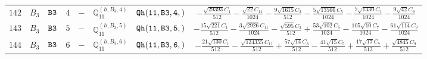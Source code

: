 \documentclass[fleqn,8pt]{jsarticle}
\begin{document}
\begin{table}[ht!]
\begin{center}
\begin{tabular}{cccccccc}
$ 142 $ & $ B_{3} $ & $ {\tt B3} $ & $ 4 $ & $ - $ & $ \mathbb{Q}_{11}^{(h,B_{3},4)} $ & $ {\tt Qh(11,B3,4,)} $ & $ - \frac{\sqrt{29393} C_{1}}{512} - \frac{\sqrt{22} C_{11}}{1024} - \frac{9 \sqrt{1615} C_{3}}{512} - \frac{5 \sqrt{13566} C_{5}}{1024} - \frac{7 \sqrt{1330} C_{7}}{1024} - \frac{9 \sqrt{42} C_{9}}{1024} $ \\
$ 143 $ & $ B_{3} $ & $ {\tt B3} $ & $ 5 $ & $ - $ & $ \mathbb{Q}_{11}^{(h,B_{3},5)} $ & $ {\tt Qh(11,B3,5,)} $ & $ - \frac{15 \sqrt{221} C_{1}}{512} - \frac{3 \sqrt{2926} C_{11}}{1024} - \frac{\sqrt{595} C_{3}}{512} + \frac{53 \sqrt{102} C_{5}}{1024} - \frac{105 \sqrt{10} C_{7}}{1024} - \frac{61 \sqrt{114} C_{9}}{1024} $ \\
$ 144 $ & $ B_{3} $ & $ {\tt B3} $ & $ 6 $ & $ - $ & $ \mathbb{Q}_{11}^{(h,B_{3},6)} $ & $ {\tt Qh(11,B3,6,)} $ & $ - \frac{21 \sqrt{130} C_{1}}{512} - \frac{\sqrt{124355} C_{11}}{512} + \frac{57 \sqrt{14} C_{3}}{512} - \frac{41 \sqrt{15} C_{5}}{512} + \frac{17 \sqrt{17} C_{7}}{512} + \frac{\sqrt{4845} C_{9}}{512} $ \\
 \hline \hline
\end{tabular}
\end{center}
\end{table}
\end{document}
